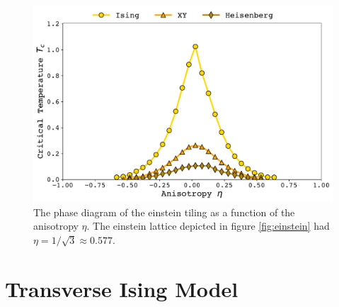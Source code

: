 \documentclass[amsmath,amssymb,aps,twocolumn,nofootinbib]{revtex4-2}
\begin{document}
\begin{figure}
  \centering
  \includegraphics[width=\linewidth]{../figs/einstein-phase.pdf}
  \caption{The phase diagram of the einstein tiling as a function of the anisotropy $\eta$. The einstein lattice depicted in figure \ref{fig:einstein} had $\eta = 1/\sqrt{3}\approx 0.577$.}
  \label{fig:einstein-phase}
\end{figure}

\section{Transverse Ising Model}
\label{sec:tim}
\end{document}
